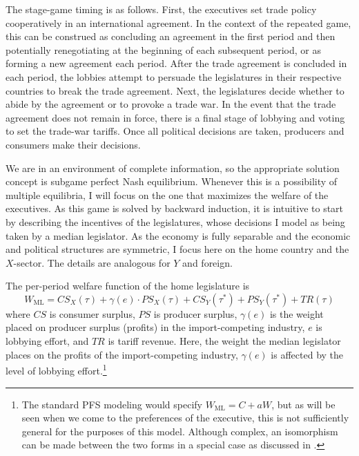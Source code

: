 \documentclass[authoryear, review]{elsarticle}
\newcommand{\ga}{\gamma}
\begin{document}
The stage-game timing is as follows. First, the executives set trade policy cooperatively in an international agreement. In the context of the repeated game, this can be construed as concluding an agreement in the first period and then potentially renegotiating at the beginning of each subsequent period, or as forming a new agreement each period. After the trade agreement is concluded in each period, the lobbies attempt to persuade the legislatures in their respective countries to break the trade agreement. Next, the legislatures decide whether to abide by the agreement or to provoke a trade war. In the event that the trade agreement does not remain in force, there is a final stage of lobbying and voting to set the trade-war tariffs. Once all political decisions are taken, producers and consumers make their decisions.

We are in an environment of complete information, so the appropriate solution concept is subgame perfect Nash equilibrium. Whenever this is a possibility of multiple equilibria, I will focus on the one that maximizes the welfare of the executives. As this game is solved by backward induction, it is intuitive to start by describing the incentives of the legislatures, whose decisions I model as being taken by a median legislator. As the economy is fully separable and the economic and political structures are symmetric, I focus here on the home country and the $X$-sector. The details are analogous for $Y$ and foreign.

The per-period welfare function of the home legislature is
\begin{equation}
  W_\text{ML} = \mathit{CS}_X(\tau) + \ga(e) \cdot \mathit{PS}_X(\tau) + \mathit{CS}_Y(\tau^*) + \mathit{PS}_Y(\tau^*) + \mathit{TR}(\tau)
  \label{eq:ml3}
\end{equation}
where $\mathit{CS}$ is consumer surplus, $\mathit{PS}$ is producer surplus, $\ga(e)$ is the weight placed on producer surplus (profits) in the import-competing industry, $e$ is lobbying effort, and $\mathit{TR}$ is tariff revenue. Here, the weight the median legislator places on the profits of the import-competing industry, $\ga(e)$ is affected by the level of lobbying effort.\footnote{The standard PFS modeling would specify $W_\text{ML} = C + aW$, but as will be seen when we come to the preferences of the executive, this is not sufficiently general for the purposes of this model. Although complex, an isomorphism can be made between the two forms in a special case as discussed in \citet{buzard2013b}.}
\end{document}
